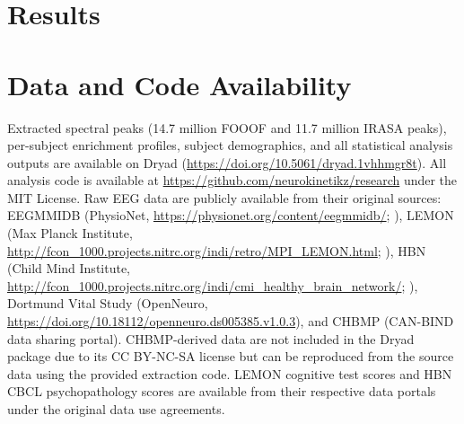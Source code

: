 \documentclass[11pt,a4paper]{article}
\begin{document}
\section{Results}











\section*{Data and Code Availability}

Extracted spectral peaks (14.7 million FOOOF and 11.7 million IRASA peaks), per-subject enrichment profiles, subject demographics, and all statistical analysis outputs are available on Dryad (\url{https://doi.org/10.5061/dryad.1vhhmgr8t}). All analysis code is available at \url{https://github.com/neurokinetikz/research} under the MIT License. Raw EEG data are publicly available from their original sources: EEGMMIDB (PhysioNet, \url{https://physionet.org/content/eegmmidb/}; \cite{goldberger2000physiobank}), LEMON (Max Planck Institute, \url{http://fcon_1000.projects.nitrc.org/indi/retro/MPI_LEMON.html}; \cite{babayan2019lemon}), HBN (Child Mind Institute, \url{http://fcon_1000.projects.nitrc.org/indi/cmi_healthy_brain_network/}; \cite{alexander2017hbn}), Dortmund Vital Study (OpenNeuro, \url{https://doi.org/10.18112/openneuro.ds005385.v1.0.3}), and CHBMP (CAN-BIND data sharing portal). CHBMP-derived data are not included in the Dryad package due to its CC BY-NC-SA license but can be reproduced from the source data using the provided extraction code. LEMON cognitive test scores and HBN CBCL psychopathology scores are available from their respective data portals under the original data use agreements.
\end{document}
